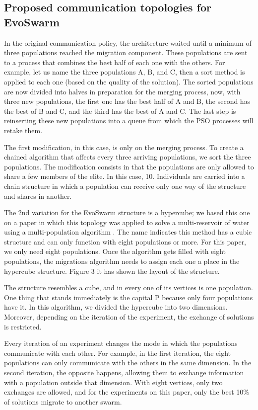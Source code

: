 \documentclass[runningheads]{llncs}
\begin{document}
\subsection{Proposed communication topologies for EvoSwarm} 

In the original communication policy, the architecture waited until a minimum of
three populations reached the migration component. These populations are sent to
a process that combines the best half of each one with the others. For example,
let us name the three populations A, B, and C, then a sort method is applied to
each one (based on the quality of the solution). The sorted populations are now
divided into halves in preparation for the merging process, now, with three new
populations, the first one has the best half of A and B, the second has the best
of B and C, and the third has the best of A and C. The last step is reinserting
these new populations into a queue from which the PSO processes will retake
them.

The first modification, in this case, is only on the merging process. To create
a chained algorithm that affects every three arriving populations, we sort the
three populations. The modification consists in that the populations are only
allowed to share a few members of the elite. In this case, 10. Individuals are
carried into a chain structure in which a population can receive only one way of
the structure and shares in another.

The 2nd variation for the EvoSwarm structure is a hypercube; we based this one
on a paper in which this topology was applied to solve a multi-reservoir of
water using a multi-population algorithm \cite{b20}. The name indicates this
method has a cubic structure and can only function with eight populations or
more. For this paper, we only need eight populations. Once the algorithm gets
filled with eight populations, the migrations algorithm needs to assign each one
a place in the hypercube structure. Figure 3 it has shown the layout of the
structure.

The structure resembles a cube, and in every one of its vertices is one
population. One thing that stands immediately is the capital P because only four
populations have it. In this algorithm, we divided the hypercube into two
dimensions. Moreover, depending on the iteration of the experiment, the exchange
of solutions is restricted.

Every iteration of an experiment changes the mode in which the populations
communicate with each other. For example, in the first iteration, the eight
populations can only communicate with the others in the same dimension. In the
second iteration, the opposite happens, allowing them to exchange information
with a population outside that dimension. With eight vertices, only two
exchanges are allowed, and for the experiments on this paper, only the best 10\%
of solutions migrate to another swarm.
\end{document}
